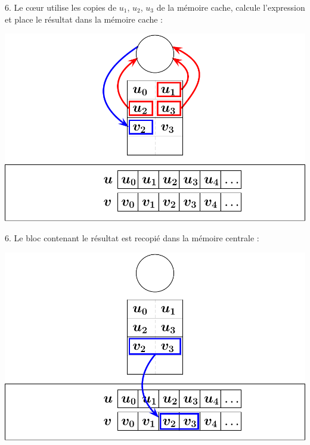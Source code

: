 \documentclass{beamer}
\begin{document}
\begin{frame}
	\parbox[t][1cm]{10cm}{6. Le c\oe ur utilise les copies de $u_1$, $u_2$, $u_3$ de la mémoire cache, calcule l'expression et place le résultat dans la mémoire cache :}
	\begin{center}
		\includegraphics[scale=0.6]{../../Images/sequentiel6}
	\end{center}
\end{frame}
\begin{frame}
	\parbox[t][1cm]{10cm}{6. Le bloc contenant le résultat est recopié dans la mémoire centrale :}
	\begin{center}
		\includegraphics[scale=0.6]{../../Images/sequentiel7}
	\end{center}
\end{frame}
\end{document}
